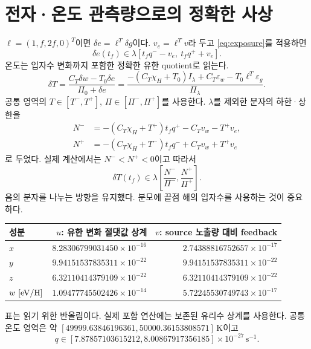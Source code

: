 \documentclass[11pt,a4paper]{article}
\numberwithin{equation}{section}
\begin{document}
\section{전자·온도 관측량으로의 정확한 사상}
$\ell=(1,f,2f,0)^T$이면 $\delta e=\ell^T\delta g$이다. $v_e=\ell^Tv$라 두고 \eqref{eq:exposure}를 적용하면
\begin{equation}
 \delta e(t_f)\in\lambda[t_fq^--v_e,\ t_fq^++v_e].
 \label{eq:einterval}
\end{equation}
온도는 입자수 변화까지 포함한 정확한 유한 quotient로 읽는다.
\begin{equation}
 \delta T=\frac{C_T\delta w-T_0\delta e}{\Pi_0+\delta e}
 =\frac{-(C_T\chi_H+T_0)I_\lambda+C_T\varepsilon_w-T_0\ell^T\varepsilon_g}{\Pi_\lambda}.
 \label{eq:Tquotient}
\end{equation}
공통 영역의 $T\in[T^-,T^+]$, $\Pi\in[\Pi^-,\Pi^+]$를 사용한다. $\lambda$를 제외한 분자의 하한·상한을
\begin{align}
 N^-&=-(C_T\chi_H+T^+)t_fq^+-C_Tv_w-T^+v_e,\\
 N^+&=-(C_T\chi_H+T^-)t_fq^-+C_Tv_w+T^+v_e
\end{align}
로 두었다. 실제 계산에서는 $N^-<N^+<0$이고 따라서
\begin{equation}
 \boxed{\delta T(t_f)\in\lambda\left[\frac{N^-}{\Pi^-},\frac{N^+}{\Pi^+}\right].}
 \label{eq:Tinterval}
\end{equation}
음의 분자를 나누는 방향을 유지했다. 분모에 끝점 해의 입자수를 사용하는 것이 중요하다.

\begin{center}
\begin{tabular}{@{}lrr@{}}\toprule
성분 & $u$: 유한 변화 절댓값 상계 & $v$: source 노출량 대비 feedback\\\midrule
$x$ & $8.28306799031450\times10^{-16}$ & $2.74388816752657\times10^{-17}$\\
$y$ & $9.94151537835311\times10^{-22}$ & $9.94151537835311\times10^{-22}$\\
$z$ & $6.32110414379109\times10^{-22}$ & $6.32110414379109\times10^{-22}$\\
$w\ [\mathrm{eV}/\mathrm H]$ & $1.09477745502426\times10^{-14}$ & $5.72245530749743\times10^{-17}$\\\bottomrule
\end{tabular}
\end{center}
표는 읽기 위한 반올림이다. 실제 포함 연산에는 보존된 유리수 상계를 사용한다. 공통 온도 영역은 약 $[49999.63846196361,50000.36153808571]\,\mathrm K$이고
\begin{equation}
 q\in[7.87857103615212,8.00867917356185]\times10^{-27}\,\mathrm s^{-1}.
\end{equation}
\end{document}
